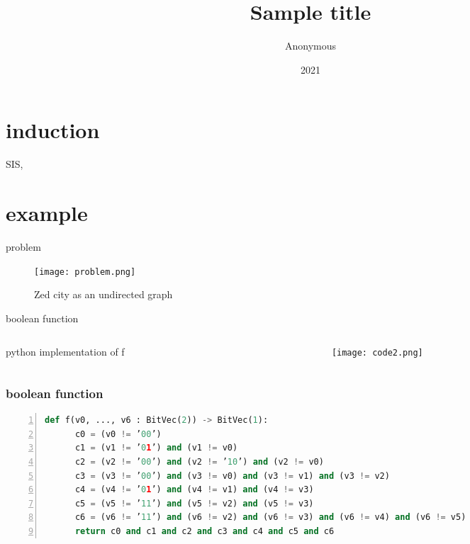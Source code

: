\documentclass[aspectratio=1610]{beamer}
\title{Sample title}
\author{Anonymous}
\institute{Overleaf}
\date{2021}
\begin{document}
\begin{frame}[plain]
  \titlepage
\end{frame}
\section{induction}
\begin{frame}
  SIS, 
\end{frame}

\section{example}
\begin{frame}{problem}
  \begin{figure}[htbq]
    \centering
    \texttt{[image: problem.png]}
    \caption{Zed city as an undirected graph} 
    \label{fig-zed}
  \end{figure}
\end{frame}
\begin{frame}{boolean function}
  \begin{columns}
    \begin{column}{0.5\linewidth}
      \begin{block}{python implementation of f }
        
      \end{block}
    \end{column}
    \begin{column}{0.5\linewidth}
      \begin{figure}[htbq]
        \centering
        \texttt{[image: code2.png]}
      \end{figure}
    \end{column}
  \end{columns}
\end{frame}
\begin{frame}[fragile]
  \frametitle{boolean function}
  \begin{lstlisting}[language={python},numbers=left, numberstyle=\tiny]
    def f(v0, ..., v6 : BitVec(2)) -> BitVec(1):
      c0 = (v0 != ’00’)
      c1 = (v1 != ’01’) and (v1 != v0)
      c2 = (v2 != ’00’) and (v2 != ’10’) and (v2 != v0)
      c3 = (v3 != ’00’) and (v3 != v0) and (v3 != v1) and (v3 != v2)
      c4 = (v4 != ’01’) and (v4 != v1) and (v4 != v3)
      c5 = (v5 != ’11’) and (v5 != v2) and (v5 != v3)
      c6 = (v6 != ’11’) and (v6 != v2) and (v6 != v3) and (v6 != v4) and (v6 != v5)
      return c0 and c1 and c2 and c3 and c4 and c5 and c6
  \end{lstlisting}
\end{frame}
\end{document}
